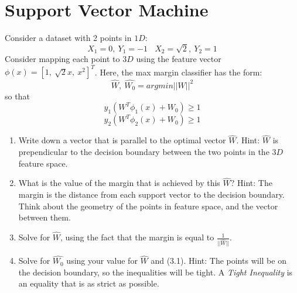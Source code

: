 \documentclass[12pt]{article}
\numberwithin{equation}{section}
\numberwithin{table}{section}
\numberwithin{figure}{section}
\begin{document}
\section{Support Vector Machine}
Consider a dataset with 2 points in $1D$:
$$
	X_1 = 0,\ Y_1 = -1 \ \ \ \ X_2 = \sqrt{2},\ Y_2 = 1
$$
Consider mapping each point to $3D$ using the feature vector $\phi(x) = [1,\ \sqrt{2}x,\  x^2]^T$. Here, the max margin classifier has the form:
\begin{equation}
	\hat{W},\ \hat{W_0} = argmin||W||^2
\end{equation}
so that
$$
	y_1(W^T\phi_1(x) + W_0) \geq 1
$$
$$
	y_2(W^T\phi_2(x) + W_0) \geq 1
$$
\begin{enumerate}[label=(\alph*)]
	\item Write down a vector that is parallel to the optimal vector $\hat{W}$. Hint: $\hat{W}$ is prependicular to the decision boundary between the two points in the $3D$ feature space.
	
	\item What is the value of the margin that is achieved by this $\hat{W}$? Hint: The margin is the distance from each support vector to the decision boundary. Think about the geometry of the points in feature space, and the vector between them.
	
	\item Solve for $\hat{W}$, using the fact that the margin is equal to $\frac{1}{||\hat{W}||}$.
	
	\item Solve for $\hat{W_0}$ using your value for $\hat{W}$ and (3.1). Hint: The points will be on the decision boundary, so the inequalities will be tight. A \textit{Tight Inequality} is an equality that is as strict as possible.
\end{enumerate}
\end{document}
